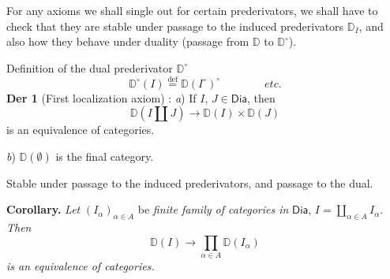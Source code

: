 \documentclass[11pt]{article}
\newcommand{\sDia}{\mathsf{Dia}}
\newcommand{\DD}{\mathbb{D}}
\begin{document}
For any axioms we shall single out for certain prederivators, we shall have to check that they are stable under passage to the induced prederivators $\DD_I$, and also how they behave under duality (passage from $\DD$ to $\DD^\circ$). %

Definition of the dual prederivator $\DD^\circ$
\[ \DD^\circ(I) \overset{\text{def}}{=} \DD(I^\circ)^\circ \qquad\qquad \textit{etc.} \]
\textbf{Der 1} (First localization axiom) : \textit{a}) If $I$, $J \in \sDia$, then
\[ \DD(I \amalg J) \longrightarrow \DD(I) \times \DD(J) \]
is an equivalence of categories.

\textit{b}) $\DD(\emptyset)$ is the final category.

Stable under passage to the induced prederivators, and passage to the dual.

\textbf{Corollary.} \textit{Let} $(I_\alpha)_{\alpha \in A}$ be \textit{finite family of categories in} $\sDia$, $I = \coprod\limits_{\alpha \in A} I_\alpha$. \textit{Then}
\[ \DD(I) \longrightarrow \prod_{\alpha \in A} \DD(I_\alpha) \]
\textit{is an equivalence of categories.}
\end{document}

